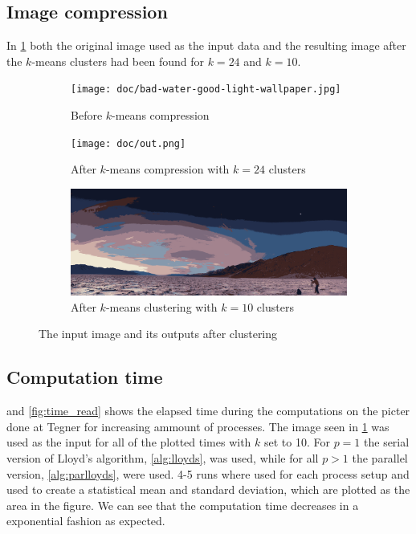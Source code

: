 
\subsection{Image compression}

In \cref{fig:imagecompr} both the original image used as the input data
and the resulting image after the $k$-means clusters had been found
for $k = 24$ and $k = 10$.

\begin{figure}[!ht]
    \centering
    \begin{subfigure}[t]{1\textwidth}
        \centering
        \texttt{[image: doc/bad-water-good-light-wallpaper.jpg]}
        \caption{Before $k$-means compression}
    \end{subfigure}
    \begin{subfigure}[t]{1\textwidth}
        \centering
        \texttt{[image: doc/out.png]}
        \caption{After $k$-means compression with $k = 24$ clusters}
    \end{subfigure}
    \begin{subfigure}[t]{\textwidth}
        \centering
        \includegraphics[width=.9\textwidth]{doc/out2.png}
        \caption{After $k$-means clustering with $k = 10$ clusters}
    \end{subfigure}
    \caption{The input image and its outputs after clustering}
    \label{fig:imagecompr}
\end{figure}

\subsection{Computation time}

 and \cref{fig:time_read}
shows the elapsed time during the computations on the picter done at Tegner
for increasing ammount of processes.
The image seen in \cref{fig:imagecompr} was used as the input for all of the plotted times with $k$ set to 10.
For $p = 1$ the serial version of Lloyd's algorithm, \cref{alg:lloyds}, was used,
while for all $p > 1$ the parallel version, \cref{alg:parlloyds}, were used.
4-5 runs where used for each process setup and used to create a statistical mean and standard deviation,
which are plotted as the area in the figure.
We can see that the computation time decreases in a exponential fashion as expected.


